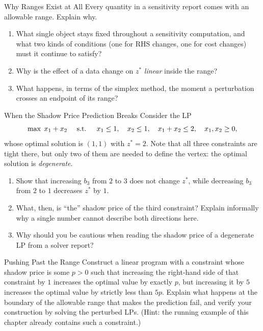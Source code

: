 \begin{ex}{Why Ranges Exist at All}{}
 Every quantity in a sensitivity report comes with an allowable range. Explain why.
\begin{enumerate}
\item What single object stays fixed throughout a sensitivity computation, and what two kinds of conditions (one for RHS changes, one for cost changes) must it continue to satisfy?
\item Why is the effect of a data change on $z^*$ \emph{linear} inside the range?
\item What happens, in terms of the simplex method, the moment a perturbation crosses an endpoint of its range?
\end{enumerate}
\exrefs{\S\ref{sec:sensitivity-overview}, \S\ref{sec:sensitivity-rhs}, \S\ref{sec:sensitivity-cost}}
\end{ex}

\begin{ex}{When the Shadow Price Prediction Breaks}{}
 Consider the LP
\[
\max \; x_1 + x_2 \quad \mbox{ s.t. } \quad x_1 \leq 1, \quad x_2 \leq 1, \quad x_1 + x_2 \leq 2, \quad x_1, x_2 \geq 0,
\]
whose optimal solution is $(1,1)$ with $z^* = 2$. Note that all three constraints are tight there, but only two of them are needed to define the vertex: the optimal solution is \emph{degenerate}.
\begin{enumerate}
\item Show that increasing $b_3$ from $2$ to $3$ does not change $z^*$, while decreasing $b_3$ from $2$ to $1$ decreases $z^*$ by $1$.
\item What, then, is ``the'' shadow price of the third constraint? Explain informally why a single number cannot describe both directions here.
\item Why should you be cautious when reading the shadow price of a degenerate LP from a solver report?
\end{enumerate}
\exrefs{\S\ref{sec:sensitivity-rhs}, \S\ref{sec:sensitivity-software}}
\end{ex}


\begin{ex}{Pushing Past the Range}{}
\label{ex:sensitivity-range-boundary}
 Construct a linear program with a constraint whose shadow price is some $p > 0$ such that increasing the right-hand side of that constraint by $1$ increases the optimal value by exactly $p$, but increasing it by $5$ increases the optimal value by strictly less than $5p$. Explain what happens at the boundary of the allowable range that makes the prediction fail, and verify your construction by solving the perturbed LPs. (Hint: the running example of this chapter already contains such a constraint.)
\exrefs{\S\ref{sec:sensitivity-rhs}, \S\ref{sec:sensitivity-overview}}
\end{ex}

